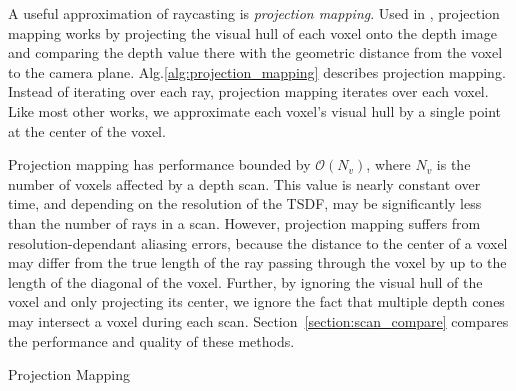 \documentclass[conference]{IEEEtran}
\newcommand{\sref}[1]{Section~\ref{#1}}
\newcommand{\algoref}[1]{Alg.\ref{#1}}
\begin{document}
A useful approximation of raycasting is \textit{projection mapping}. Used in
\cite{Newcombe,Nguyen2012, Bylow2013, Klingensmith2014}, projection mapping
works by projecting the visual hull of each voxel onto the depth image and
comparing the depth value there with the geometric distance from the voxel to
the camera plane. \algoref{alg:projection_mapping} describes projection mapping.
Instead of iterating over each ray, projection mapping iterates over each voxel.
Like most other works, we approximate each voxel's visual hull by a single point
at the center of the voxel.

Projection mapping has performance bounded by $\mathcal{O}(N_v)$, where $N_v$ is
the number of voxels affected by a depth scan. This value is nearly constant
over time, and depending on the resolution of the TSDF, may be significantly
less than the number of rays in a scan. However, projection mapping suffers from
resolution-dependant aliasing errors, because the distance to the center of a
voxel may differ from the true length of the ray passing through the voxel by up
to the length of the diagonal of the voxel. Further, by ignoring the visual
hull of the voxel and only projecting its center, we ignore the fact that
multiple depth cones may intersect a voxel during each scan.
\sref{section:scan_compare} compares the performance and quality of these methods.

\begin{algorithm} 
	\caption{Projection Mapping}
	\label{alg:projection_mapping}
	\begin{algorithmic}[1]
		 
		  
	     
		    	\label{alg:line:voxel_carve}
			\EndIf
	    \EndIf
		  
			\label{alg:line:tsdf_update}
		\EndIf
	\EndFor
	\end{algorithmic}
\end{algorithm}
\end{document}
